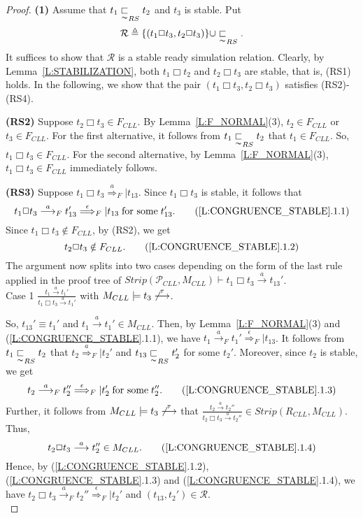 \documentclass{elsarticle}
\theoremstyle{plain}
\theoremstyle{definition}
\begin{document}
\begin{proof}
\textbf{(1)} Assume that $t_1 \underset{\thicksim}{\sqsubset}_{RS} t_2$ and $t_3$ is stable. Put
\[{\mathcal R}\triangleq \{(t_1 \Box t_3 , t_2 \Box t_3 )\} \cup \underset{\thicksim}{\sqsubset}_{RS}.\]
It suffices to show that $\mathcal R$ is a stable ready simulation relation.
Clearly, by Lemma~\ref{L:STABILIZATION}, both $t_1 \Box t_2$ and $t_2 \Box t_3$ are stable, that is, (RS1) holds. In the following, we show that the pair $(t_1\Box t_3, t_2\Box t_3)$ satisfies (RS2)-(RS4).

\textbf{(RS2)} Suppose  $t_2 \Box t_3 \in F_{{CLL}}$.
    By Lemma~\ref{L:F_NORMAL}(3), $t_2 \in F_{{CLL}}$ or $t_3 \in F_{{CLL}}$.
    For the first alternative, it follows from $t_1 \underset{\thicksim}{\sqsubset}_{RS} t_2$ that $t_1 \in F_{{CLL}}$. So, $t_1 \Box t_3  \in F_{{CLL}}$.
    For the second alternative, by Lemma~\ref{L:F_NORMAL}(3), $t_1 \Box t_3  \in F_{{CLL}}$ immediately follows.

\textbf{(RS3)} Suppose $t_1 \Box t_3 \stackrel{a}{\Longrightarrow}_F|t_{13}$.
    Since $t_1\Box t_3$ is stable, it follows that
    \[t_1 \Box t_3 \stackrel{a}{\longrightarrow}_F t_{13}' \stackrel{\epsilon}{\Longrightarrow}_F|t_{13}\;\text{for some}\; t_{13}'.\tag{\ref{L:CONGRUENCE_STABLE}.1.1}\]
    Since $t_1 \Box t_3 \notin F_{{CLL}}$, by (RS2), we get
    \[t_2 \Box t_3 \notin F_{{CLL}}.\tag{\ref{L:CONGRUENCE_STABLE}.1.2}\]
     The argument now splits into two cases depending on  the form of the last rule applied in the proof tree of $Strip({\mathcal P}_{CLL},M_{{CLL}}) \vdash t_1 \Box t_3 \stackrel{a}{\longrightarrow}t_{13}'$.\\

\noindent  Case 1 $\frac{t_1 \stackrel{a}{\longrightarrow} t_1'}{t_1 \Box t_3 \stackrel{a}{\longrightarrow} t_1'}$ with $M_{{CLL}} \models t_3 \not\stackrel{\tau}{\longrightarrow}$.

        So, $t_{13}' \equiv t_1'$ and $t_1 \stackrel{a}{\longrightarrow} t_1' \in M_{{CLL}}$.
        Then, by Lemma~\ref{L:F_NORMAL}(3) and (\ref{L:CONGRUENCE_STABLE}.1.1), we have $t_1 \stackrel{a}{\longrightarrow}_F t_1' \stackrel{\epsilon}{\Longrightarrow}_F|t_{13}$.
        It follows from $t_1 \underset{\thicksim}{\sqsubset}_{RS} t_2$ that $t_2  \stackrel{a}{\Longrightarrow}_F|t_2'$ and $t_{13} \underset{\thicksim}{\sqsubset}_{RS} t_2'$ for some $t_2'$.
        Moreover, since $t_2$ is stable, we get
        \[t_2 \stackrel{a}{\longrightarrow}_F t_2'' \stackrel{\epsilon}{\Longrightarrow}_F|t_2'\;\text{for some}\; t_2''. \tag{\ref{L:CONGRUENCE_STABLE}.1.3}\]
        Further, it follows from $M_{{CLL}} \models t_3 \not\stackrel{\tau}{\longrightarrow}$ that $\frac{t_2 \stackrel{a}{\longrightarrow} t_2''}{t_2 \Box t_3 \stackrel{a}{\longrightarrow}t_2''} \in Strip(R_{CLL},M_{{CLL}})$.
        Thus,
        \[t_2 \Box t_3 \stackrel{a}{\longrightarrow}t_2'' \in M_{{CLL}}.\tag{\ref{L:CONGRUENCE_STABLE}.1.4}\]
        Hence, by (\ref{L:CONGRUENCE_STABLE}.1.2), (\ref{L:CONGRUENCE_STABLE}.1.3) and (\ref{L:CONGRUENCE_STABLE}.1.4), we have  $t_2 \Box t_3 \stackrel{a}{\longrightarrow}_F t_2'' \stackrel{\epsilon}{\Longrightarrow}_F|t_2'$ and $(t_{13},t_2') \in {\mathcal R}$.\\


\end{proof}
\end{document}
